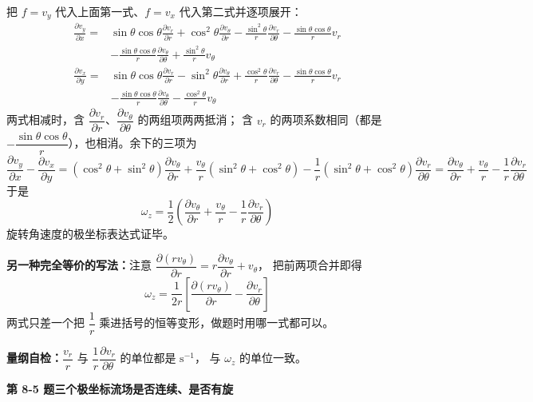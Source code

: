 \begin{jie}
把 $f=v_y$ 代入上面第一式、$f=v_x$ 代入第二式并逐项展开：
\[ \begin{aligned}
\frac{\partial v_y}{\partial x}={}&
 \sin\theta\cos\theta\frac{\partial v_r}{\partial r}+\cos^2\theta\frac{\partial v_\theta}{\partial r}
 -\frac{\sin^2\theta}{r}\frac{\partial v_r}{\partial\theta}-\frac{\sin\theta\cos\theta}{r}v_r\\
 &-\frac{\sin\theta\cos\theta}{r}\frac{\partial v_\theta}{\partial\theta}+\frac{\sin^2\theta}{r}v_\theta
\end{aligned} \]
\[ \begin{aligned}
\frac{\partial v_x}{\partial y}={}&
 \sin\theta\cos\theta\frac{\partial v_r}{\partial r}-\sin^2\theta\frac{\partial v_\theta}{\partial r}
 +\frac{\cos^2\theta}{r}\frac{\partial v_r}{\partial\theta}-\frac{\sin\theta\cos\theta}{r}v_r\\
 &-\frac{\sin\theta\cos\theta}{r}\frac{\partial v_\theta}{\partial\theta}-\frac{\cos^2\theta}{r}v_\theta
\end{aligned} \]
两式相减时，含 $\dfrac{\partial v_r}{\partial r}$、$\dfrac{\partial v_\theta}{\partial\theta}$ 的两组项两两抵消；
含 $v_r$ 的两项系数相同（都是 $-\dfrac{\sin\theta\cos\theta}{r}$），也相消。余下的三项为
\[ \frac{\partial v_y}{\partial x}-\frac{\partial v_x}{\partial y}
 =\left(\cos^2\theta+\sin^2\theta\right)\frac{\partial v_\theta}{\partial r}
 +\frac{v_\theta}{r}\left(\sin^2\theta+\cos^2\theta\right)
 -\frac{1}{r}\left(\sin^2\theta+\cos^2\theta\right)\frac{\partial v_r}{\partial\theta}
 =\frac{\partial v_\theta}{\partial r}+\frac{v_\theta}{r}-\frac{1}{r}\frac{\partial v_r}{\partial\theta} \]
于是
\[ \omega_z=\frac{1}{2}\left(\frac{\partial v_\theta}{\partial r}+\frac{v_\theta}{r}-\frac{1}{r}\frac{\partial v_r}{\partial\theta}\right) \]
旋转角速度的极坐标表达式证毕。

\textbf{另一种完全等价的写法：}注意
$\dfrac{\partial(rv_\theta)}{\partial r}=r\dfrac{\partial v_\theta}{\partial r}+v_\theta$，
把前两项合并即得
\[ \omega_z=\frac{1}{2r}\left[\frac{\partial(rv_\theta)}{\partial r}-\frac{\partial v_r}{\partial\theta}\right] \]
两式只差一个把 $\dfrac{1}{r}$ 乘进括号的恒等变形，做题时用哪一式都可以。

\textbf{量纲自检：}$\dfrac{v_r}{r}$ 与 $\dfrac{1}{r}\dfrac{\partial v_r}{\partial\theta}$ 的单位都是 $\mathrm{s^{-1}}$，
与 $\omega_z$ 的单位一致。
\end{jie}

\noindent\textbf{第 8-5 题\quad 三个极坐标流场是否连续、是否有旋}

